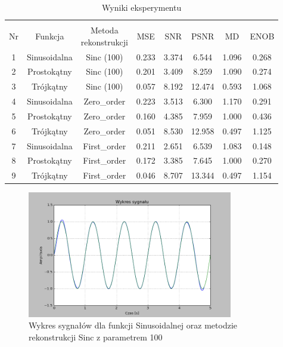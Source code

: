 \documentclass{article}
\begin{document}
    \begin{table}[h!]
        \centering
        \vspace{0.2cm}
        \begin{tabular}{|c|c|c|c|c|c|c|c|}
            \hline\hline\\[-0.4cm]
            Nr & Funkcja & \shortstack{Metoda\\ rekonstrukcji} & MSE & SNR & PSNR & MD & ENOB  \\
            \hline
            1 & Sinusoidalna & Sinc (100) & 0.233 & 3.374 & 6.544 & 1.096 & 0.268  \\
            \hline
            2 & Prostokątny & Sinc (100) & 0.201 & 3.409 & 8.259 & 1.090 & 0.274   \\
            \hline
            3 & Trójkątny & Sinc (100) & 0.057 & 8.192 & 12.474 & 0.593 & 1.068   \\
            \hline
            4 & Sinusoidalna & Zero\_order & 0.223 & 3.513 & 6.300 & 1.170 & 0.291  \\
            \hline
            5 & Prostokątny & Zero\_order & 0.160 & 4.385 & 7.959 & 1.000 & 0.436   \\
            \hline
            6 & Trójkątny & Zero\_order & 0.051 & 8.530 & 12.958 & 0.497 & 1.125   \\
            \hline
            7 & Sinusoidalna & First\_order & 0.211 & 2.651 & 6.539 & 1.083 & 0.148    \\
            \hline
            8 & Prostokątny & First\_order & 0.172 & 3.385 & 7.645 & 1.000 & 0.270   \\
            \hline
            9 & Trójkątny & First\_order & 0.046 & 8.707 & 13.344 & 0.497 & 1.154   \\
            \hline
        \end{tabular}
        \caption{Wyniki eksperymentu}
    \end{table}
    \FloatBarrier

    \begin{figure}[h!]
        \centering
        \includegraphics[width=0.8\textwidth]{img/1/sinc5.png}
        \caption{Wykres sygnałów dla funkcji Sinusoidalnej oraz metodzie rekonstrukcji Sinc z parametrem 100}
    \end{figure}
    \FloatBarrier
\end{document}
